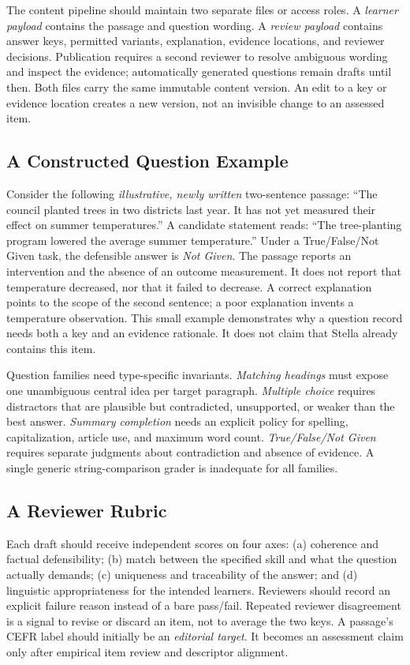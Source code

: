 \documentclass[conference,10pt]{IEEEtran}
\begin{document}
The content pipeline should maintain two separate files or access roles. A \emph{learner payload} contains the passage and question wording. A \emph{review payload} contains answer keys, permitted variants, explanation, evidence locations, and reviewer decisions. Publication requires a second reviewer to resolve ambiguous wording and inspect the evidence; automatically generated questions remain drafts until then. Both files carry the same immutable content version. An edit to a key or evidence location creates a new version, not an invisible change to an assessed item.

\subsection{A Constructed Question Example}
Consider the following \emph{illustrative, newly written} two-sentence passage: ``The council planted trees in two districts last year. It has not yet measured their effect on summer temperatures.'' A candidate statement reads: ``The tree-planting program lowered the average summer temperature.'' Under a True/False/Not Given task, the defensible answer is \emph{Not Given}. The passage reports an intervention and the absence of an outcome measurement. It does not report that temperature decreased, nor that it failed to decrease. A correct explanation points to the scope of the second sentence; a poor explanation invents a temperature observation. This small example demonstrates why a question record needs both a key and an evidence rationale. It does not claim that Stella already contains this item.

Question families need type-specific invariants. \emph{Matching headings} must expose one unambiguous central idea per target paragraph. \emph{Multiple choice} requires distractors that are plausible but contradicted, unsupported, or weaker than the best answer. \emph{Summary completion} needs an explicit policy for spelling, capitalization, article use, and maximum word count. \emph{True/False/Not Given} requires separate judgments about contradiction and absence of evidence. A single generic string-comparison grader is inadequate for all families.

\subsection{A Reviewer Rubric}
Each draft should receive independent scores on four axes: (a) coherence and factual defensibility; (b) match between the specified skill and what the question actually demands; (c) uniqueness and traceability of the answer; and (d) linguistic appropriateness for the intended learners. Reviewers should record an explicit failure reason instead of a bare pass/fail. Repeated reviewer disagreement is a signal to revise or discard an item, not to average the two keys. A passage's CEFR label should initially be an \emph{editorial target}. It becomes an assessment claim only after empirical item review and descriptor alignment.
\end{document}
